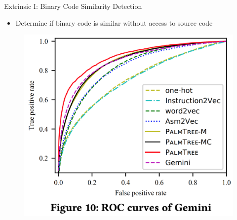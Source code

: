 \documentclass{beamer}
\begin{document}
\begin{frame}{Extrinsic I: Binary Code Similarity Detection}
	
	\begin{itemize}
		\item Determine if binary code is similar without access to source code
	\end{itemize}

	\begin{figure}[h]
	\includegraphics[scale=.3]{images/Gemini.png}
	\end{figure}
	
\end{frame}
\end{document}
